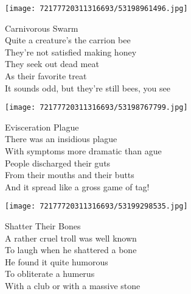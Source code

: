 \documentclass[10pt,letterpaper]{article}
\begin{document}
\begin{center}
\texttt{[image: 72177720311316693/53198961496.jpg]}
\end{center}

\begin{center}
Carnivorous Swarm\\
\vskip 0.2in
Quite a creature's the carrion bee\\
They're not satisfied making honey\\
They seek out dead meat\\
As their favorite treat\\
It sounds odd, but they're still bees, you see\\
\end{center}
\pagebreak

\begin{center}
\texttt{[image: 72177720311316693/53198767799.jpg]}
\end{center}

\begin{center}
Evisceration Plague\\
\vskip 0.2in
There was an insidious plague\\
With symptoms more dramatic than ague\\
People discharged their guts\\
From their mouths and their butts\\
And it spread like a gross game of tag!\\
\end{center}
\pagebreak

\begin{center}
\texttt{[image: 72177720311316693/53199298535.jpg]}
\end{center}

\begin{center}
Shatter Their Bones\\
\vskip 0.2in
A rather cruel troll was well known\\
To laugh when he shattered a bone\\
He found it quite humorous\\
To obliterate a humerus\\
With a club or with a massive stone\\
\end{center}
\pagebreak
\end{document}
